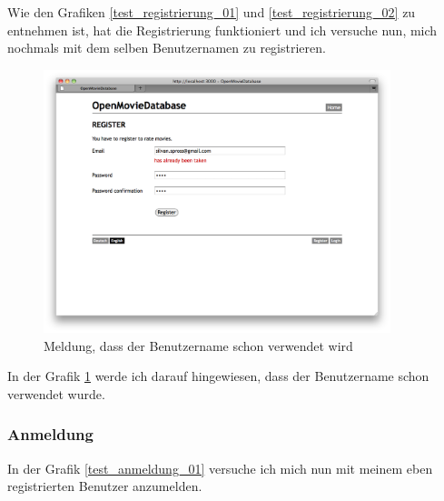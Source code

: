 Wie den Grafiken \ref{test_registrierung_01} und \ref{test_registrierung_02} zu 
entnehmen ist, hat die Registrierung funktioniert und ich versuche nun, mich 
nochmals mit dem selben Benutzernamen zu registrieren.

\begin{figure}[ht]
    \begin{center}
        \includegraphics[width=0.9\textwidth,angle=0]{./bilder/tests/test_registrierung_03.png}
        \caption{Meldung, dass der Benutzername schon verwendet wird}
        \label{test_registrierung_03}
    \end{center}
\end{figure}

In der Grafik \ref{test_registrierung_03} werde ich darauf hingewiesen, dass
der Benutzername schon verwendet wurde.

\clearpage

\subsubsection{Anmeldung}
In der Grafik \ref{test_anmeldung_01} versuche ich mich nun mit meinem eben
registrierten Benutzer anzumelden.

